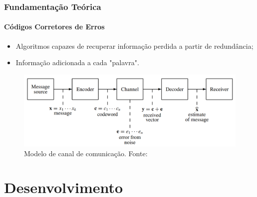 \documentclass[aspectratio=169]{beamer}
\begin{document}
\begin{frame}

\frametitle{Fundamentação Teórica}
\framesubtitle{Códigos Corretores de Erros}

\begin{itemize}
    \item Algoritmos capazes de recuperar informação perdida a partir de redundância;
    \item Informação adicionada a cada "palavra".
\end{itemize}

\begin{figure}
  \centering
  \includegraphics[scale=0.35]{img/Comm.png}
  \caption{Modelo de canal de comunicação. Fonte: }
\end{figure}

\end{frame}

\section{Desenvolvimento}
\end{document}

